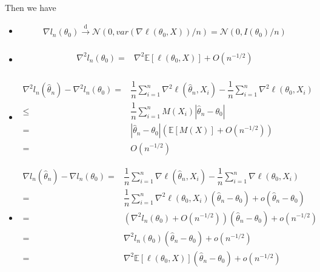 \documentclass[11pt,a4paper]{ctexart}
\numberwithin{equation}{section}%
\begin{document}
Then we have
\begin{itemize}[topsep=2pt,itemsep=0pt]
    \item 
    \begin{align*}
        \nabla l_n(\theta _0)\xrightarrow[]{\mathrm{d}} \mathcal{N}(0, var(\nabla \ell (\theta _0, X))/n) = \mathcal{N}(0, I(\theta _0)/n)
    \end{align*}
    \item
    \begin{align*}
        \nabla^2 l_n(\theta _0) =& \nabla^2 \mathbb{E}\left[ \ell(\theta _0,X) \right] + O(n^{-1/2}) \\
    \end{align*}
    \item 
    \begin{align*}
        \nabla^2 l_n(\hat{\theta } _n) - \nabla^2 l_n(\theta _0) =& \dfrac{ 1 }{ n }\sum_{i=1}^n \nabla^2 \ell (\hat{\theta } _n, X_i) - \dfrac{ 1 }{ n }\sum_{i=1}^n \nabla^2 \ell (\theta _0, X_i) \\
        \leq & \dfrac{ 1 }{ n }\sum_{i=1}^n M(X_i) \left\vert \hat{\theta }_n- \theta _0 \right\vert \\
        =& \left\vert \hat{\theta }_n- \theta _0 \right\vert (\mathbb{E}\left[ M(X) \right] + O(n^{-1/2})) \\
        =& O(n^{-1/2})
    \end{align*}
    
    \item 
    \begin{align*}
        \nabla l_n(\hat{\theta }_n) - \nabla l_n(\theta _0) =& \dfrac{ 1 }{ n }\sum_{i=1}^n \nabla \ell (\hat{\theta } _n, X_i) - \dfrac{ 1 }{ n }\sum_{i=1}^n \nabla \ell (\theta _0, X_i) \\ 
        =& \dfrac{ 1 }{ n }\sum_{i=1}^n \nabla^2 \ell (\theta _0, X_i) (\hat{\theta }_n- \theta _0) + o(\hat{\theta }_n- \theta _0) \\
        =& (\nabla^2 l_n(\theta _0) + O(n^{-1/2}))(\hat{\theta }_n- \theta _0) + o(n^{-1/2})\\
        =& \nabla^2 l_n(\theta _0)(\hat{\theta }_n- \theta _0) + o(n^{-1/2})\\
        =& \nabla^2 \mathbb{E}\left[ \ell(\theta _0,X) \right](\hat{\theta }_n- \theta _0) + o(n^{-1/2})\\
    \end{align*}




    
    
    
    
    
    
\end{itemize}
\end{document}
